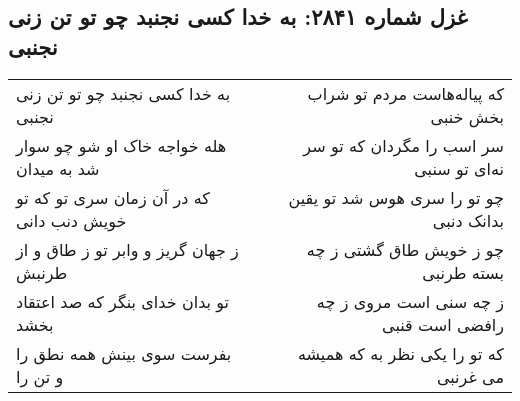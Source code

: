 \begin{center}
\section*{غزل شماره ۲۸۴۱: به خدا کسی نجنبد چو تو تن زنی نجنبی}
\label{sec:2841}
\begin{longtable}{l p{0.5cm} r}
به خدا کسی نجنبد چو تو تن زنی نجنبی
&&
که پیاله‌هاست مردم تو شراب بخش خنبی
\\
هله خواجه خاک او شو چو سوار شد به میدان
&&
سر اسب را مگردان که تو سر نه‌ای تو سنبی
\\
که در آن زمان سری تو که تو خویش دنب دانی
&&
چو تو را سری هوس شد تو یقین بدانک دنبی
\\
ز جهان گریز و وابر تو ز طاق و از طرنبش
&&
چو ز خویش طاق گشتی ز چه بسته طرنبی
\\
تو بدان خدای بنگر که صد اعتقاد بخشد
&&
ز چه سنی است مروی ز چه رافضی است قنبی
\\
بفرست سوی بینش همه نطق را و تن را
&&
که تو را یکی نظر به که همیشه می غرنبی
\\
\end{longtable}
\end{center}
